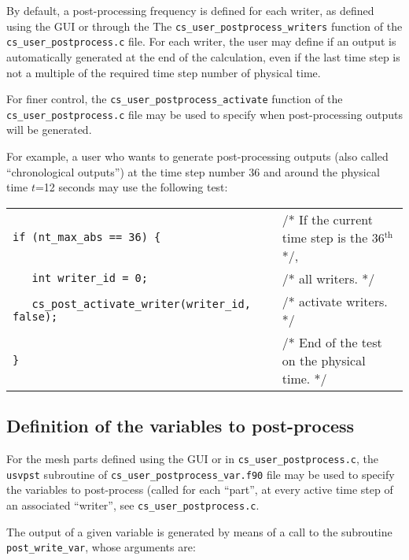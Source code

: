 {{{By default, a post-processing frequency is defined for each writer,
as defined using the GUI or through the The
\texttt{cs\_user\_postprocess\_writers}
function of the \texttt{cs\_user\_postprocess.c} file. For each writer,
the user may define if an output is automatically generated at the end
of the calculation, even if the last time step is not a multiple of the
required time step number of physical time.

For finer control, the \texttt{cs\_user\_postprocess\_activate} function of the
\texttt{cs\_user\_postprocess.c} file may be used to specify when
post-processing outputs will be generated.

For example, a user who wants to generate post-processing outputs (also
called ``chronological outputs'') at
the time step number 36 and around the physical time $t$=12 seconds may
use the following test:\\

\begin{tabular}{ll}
\mbox{\texttt{if (nt\_max\_abs == 36) \{}}
                    & /* If the current time step is the 36$^{\text{th}}$ */,\\
\mbox{\texttt{~~~int writer\_id = 0;}}
                    & /* all writers. */ \\
\mbox{\texttt{~~~cs\_post\_activate\_writer(writer\_id, false);}}
                    & /* activate writers. */ \\
\mbox{\texttt{\}}}
                    & /* End of the test on the physical time. */ \\
\end{tabular}

\subsection{Definition of the variables to post-process}

For the mesh parts defined using the GUI or in \texttt{cs\_user\_postprocess.c},
the \texttt{usvpst} subroutine  of \texttt{cs\_user\_postprocess\_var.f90} file
may be used to specify the variables to
post-process (called for each ``part'', at every active time step of an
associated ``writer'', see \texttt{cs\_user\_postprocess.c}.

The output of a given variable is generated by means of a call to the subroutine
\texttt{post\_write\_var}, whose arguments are:

}}}
